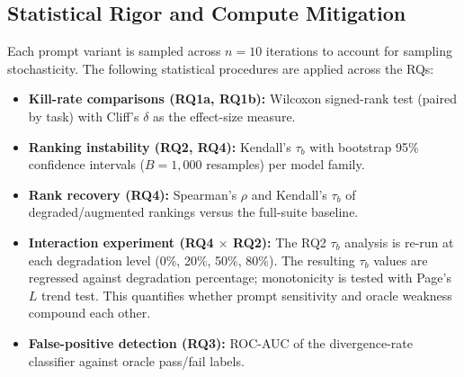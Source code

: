 \documentclass[11pt,a4paper]{article}
\begin{document}
\subsection{Statistical Rigor and Compute Mitigation}
Each prompt variant is sampled across $n=10$ iterations to account for sampling stochasticity. The following statistical procedures are applied across the RQs:

\begin{itemize}
    \item \textbf{Kill-rate comparisons (RQ1a, RQ1b):} Wilcoxon signed-rank test (paired by task) with Cliff's $\delta$ as the effect-size measure.
    \item \textbf{Ranking instability (RQ2, RQ4):} Kendall's $\tau_b$ with bootstrap 95\% confidence intervals ($B=1,000$ resamples) per model family.
    \item \textbf{Rank recovery (RQ4):} Spearman's $\rho$ and Kendall's $\tau_b$ of degraded/augmented rankings versus the full-suite baseline.
    \item \textbf{Interaction experiment (RQ4 $\times$ RQ2):} The RQ2 $\tau_b$ analysis is re-run at each degradation level (0\%, 20\%, 50\%, 80\%). The resulting $\tau_b$ values are regressed against degradation percentage; monotonicity is tested with Page's $L$ trend test. This quantifies whether prompt sensitivity and oracle weakness compound each other.
    \item \textbf{False-positive detection (RQ3):} ROC-AUC of the divergence-rate classifier against oracle pass/fail labels.
\end{itemize}
\end{document}
